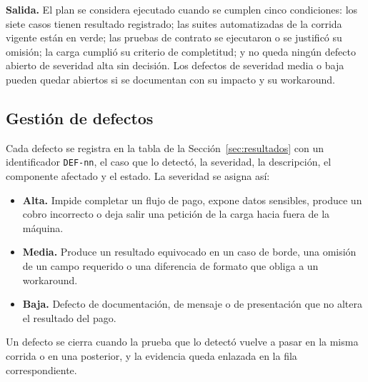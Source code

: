 \textbf{Salida.} El plan se considera ejecutado cuando se cumplen cinco condiciones: los siete casos tienen resultado registrado; las suites automatizadas de la corrida vigente están en verde; las pruebas de contrato se ejecutaron o se justificó su omisión; la carga cumplió su criterio de completitud; y no queda ningún defecto abierto de severidad alta sin decisión. Los defectos de severidad media o baja pueden quedar abiertos si se documentan con su impacto y su workaround.

\subsection{Gestión de defectos}

Cada defecto se registra en la tabla de la Sección~\ref{sec:resultados} con un identificador \texttt{DEF-nn}, el caso que lo detectó, la severidad, la descripción, el componente afectado y el estado. La severidad se asigna así:

\begin{itemize}
  \item \textbf{Alta.} Impide completar un flujo de pago, expone datos sensibles, produce un cobro incorrecto o deja salir una petición de la carga hacia fuera de la máquina.
  \item \textbf{Media.} Produce un resultado equivocado en un caso de borde, una omisión de un campo requerido o una diferencia de formato que obliga a un workaround.
  \item \textbf{Baja.} Defecto de documentación, de mensaje o de presentación que no altera el resultado del pago.
\end{itemize}

Un defecto se cierra cuando la prueba que lo detectó vuelve a pasar en la misma corrida o en una posterior, y la evidencia queda enlazada en la fila correspondiente.
